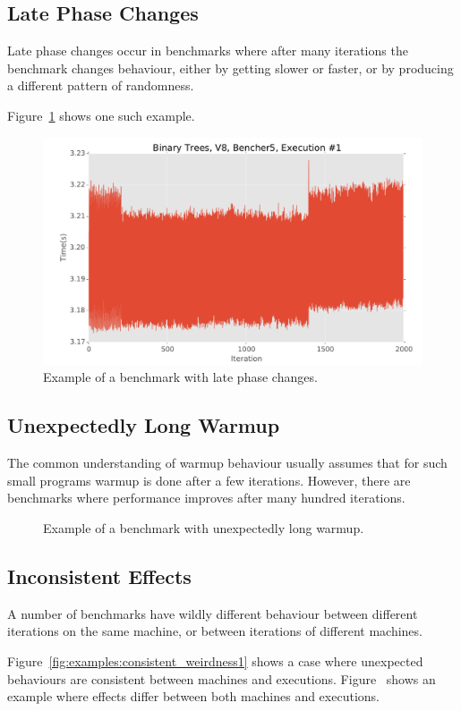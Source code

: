 \documentclass[a4paper,UKenglish]{lipics}
\begin{document}
\subsection{Late Phase Changes}
\label{sub:phase}

Late phase changes occur in benchmarks where after many iterations the benchmark
changes behaviour, either by getting slower or faster, or by producing a
different pattern of randomness.

Figure~\ref{fig:examples:late1} shows one such example.

\begin{figure}[h!]
\centering
\includegraphics[width=.46\textwidth]{examples/late1}
\caption{Example of a benchmark with late phase changes.}
\label{fig:examples:late1}
\end{figure}


\subsection{Unexpectedly Long Warmup}
\label{sub:long}

The common understanding of warmup behaviour usually assumes that for such
small programs warmup is done after a few iterations. However, there are
benchmarks where performance improves after many hundred iterations.

\begin{figure}[h!]
\centering
{}
\caption{Example of a benchmark with unexpectedly long warmup.}
\label{fig:examples:long}
\end{figure}

\subsection{Inconsistent Effects}
\label{sub:inconsistent}

A number of benchmarks have wildly different behaviour between different
iterations on the same machine, or between iterations of different machines.

Figure~\ref{fig:examples:consistent_weirdness1} shows a case where
unexpected behaviours are consistent between machines and executions.
Figure~\label{fig:examples:inconsistent_weirdness1} shows an example where
effects differ between both machines and executions.
\end{document}
